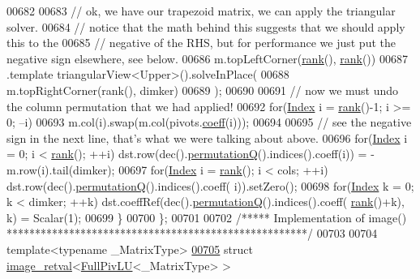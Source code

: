 \begin{DoxyCode}
00682 
00683     \textcolor{comment}{// ok, we have our trapezoid matrix, we can apply the triangular solver.}
00684     \textcolor{comment}{// notice that the math behind this suggests that we should apply this to the}
00685     \textcolor{comment}{// negative of the RHS, but for performance we just put the negative sign elsewhere, see below.}
00686     m.topLeftCorner(\hyperlink{group___l_u___module_a67a870aa69e699e058d04802ba0bdad9}{rank}(), \hyperlink{group___l_u___module_a67a870aa69e699e058d04802ba0bdad9}{rank}())
00687      .template triangularView<Upper>().solveInPlace(
00688         m.topRightCorner(rank(), dimker)
00689       );
00690 
00691     \textcolor{comment}{// now we must undo the column permutation that we had applied!}
00692     \textcolor{keywordflow}{for}(\hyperlink{namespace_eigen_a62e77e0933482dafde8fe197d9a2cfde}{Index} i = \hyperlink{group___l_u___module_a67a870aa69e699e058d04802ba0bdad9}{rank}()-1; i >= 0; --i)
00693       m.col(i).swap(m.col(pivots.\hyperlink{class_eigen_1_1_plain_object_base_afbfc12954f16d21aedb7bd839f64a278}{coeff}(i)));
00694 
00695     \textcolor{comment}{// see the negative sign in the next line, that's what we were talking about above.}
00696     \textcolor{keywordflow}{for}(\hyperlink{namespace_eigen_a62e77e0933482dafde8fe197d9a2cfde}{Index} i = 0; i < \hyperlink{group___l_u___module_a67a870aa69e699e058d04802ba0bdad9}{rank}(); ++i) dst.row(dec().\hyperlink{group___l_u___module_a8d18190c7618de271cba7293f0493a36}{permutationQ}().indices().coeff(i))
       = -m.row(i).tail(dimker);
00697     \textcolor{keywordflow}{for}(\hyperlink{namespace_eigen_a62e77e0933482dafde8fe197d9a2cfde}{Index} i = \hyperlink{group___l_u___module_a67a870aa69e699e058d04802ba0bdad9}{rank}(); i < cols; ++i) dst.row(dec().\hyperlink{group___l_u___module_a8d18190c7618de271cba7293f0493a36}{permutationQ}().indices().coeff(
      i)).setZero();
00698     \textcolor{keywordflow}{for}(\hyperlink{namespace_eigen_a62e77e0933482dafde8fe197d9a2cfde}{Index} k = 0; k < dimker; ++k) dst.coeffRef(dec().\hyperlink{group___l_u___module_a8d18190c7618de271cba7293f0493a36}{permutationQ}().indices().coeff(
      \hyperlink{group___l_u___module_a67a870aa69e699e058d04802ba0bdad9}{rank}()+k), k) = Scalar(1);
00699   \}
00700 \};
00701 
00702 \textcolor{comment}{/***** Implementation of image() *****************************************************/}
00703 
00704 \textcolor{keyword}{template}<\textcolor{keyword}{typename} \_MatrixType>
\hyperlink{struct_eigen_1_1internal_1_1image__retval_3_01_full_piv_l_u_3_01___matrix_type_01_4_01_4}{00705} \textcolor{keyword}{struct }\hyperlink{struct_eigen_1_1internal_1_1image__retval}{image\_retval}<\hyperlink{group___l_u___module_class_eigen_1_1_full_piv_l_u}{FullPivLU}<\_MatrixType> >

\end{DoxyCode}
